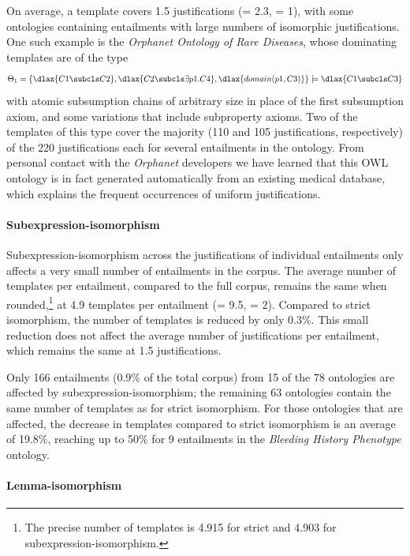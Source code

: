 On average, a template covers 1.5 justifications (\sdev = 2.3, \median = 1), with some ontologies containing entailments with large numbers of isomorphic justifications. One such example is the \emph{Orphanet Ontology of Rare Diseases}, whose dominating templates are of the type
\begin{align*}
\Theta_{1} =\{\dlax{C1 \subcls C2}, \dlax{C2 \subcls \exists p1.C4}, \dlax{domain(p1, C3)} \} \models \dlax{C1 \subcls C3}
\end{align*}
with atomic subsumption chains of arbitrary size in place of the first subsumption axiom, and some variations that include subproperty axioms. Two of the templates of this type cover the majority (110 and 105 justifications, respectively) of the 220 justifications each for several entailments in the ontology. From personal contact with the \emph{Orphanet} developers we have learned that this OWL ontology is in fact generated automatically from an existing medical database, which explains the frequent occurrences of uniform justifications.


\paragraph{Subexpression-isomorphism}

Subexpression-isomorphism across the justifications of individual entailments only affects a very  small number of entailments in the corpus. The average number of templates per entailment, compared to the full corpus, remains the same when rounded,\footnote{The precise number of templates is 4.915 for strict and 4.903 for subexpression-isomorphism.} at 4.9 templates per entailment (\sdev = 9.5, \median = 2). Compared to strict isomorphism, the number of templates is reduced by only 0.3\%. This small reduction does not affect the average number of justifications per entailment, which remains the same at 1.5 justifications.

Only 166 entailments (0.9\% of the total corpus) from 15 of the 78 ontologies are affected by subexpression-isomorphism; the remaining 63 ontologies contain the same number of templates as for strict isomorphism. For those ontologies that are affected, the decrease in templates compared to strict isomorphism is an average of 19.8\%, reaching up to 50\% for 9 entailments in the \emph{Bleeding History Phenotype} ontology.

\paragraph{Lemma-isomorphism}

